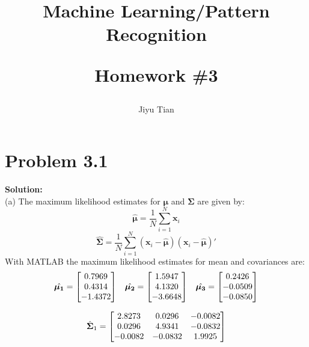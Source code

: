 \documentclass[12pt]{article}
\title{Machine Learning/Pattern Recognition\\  \begin{Large} Homework \#3 \end{Large} }
\author{Jiyu Tian}
\date{}
\begin{document}
\maketitle
\section{Problem 3.1}
\large{\textbf{Solution:}}\\
(a) The maximum likelihood estimates for $\bm{\mu}$ and $\bm{\Sigma}$ are given by:
\begin{equation*}
\hat{\bm{\mu}} = \frac{1}{N} \sum^N_{i=1} \bm{x}_i
\end{equation*}
\begin{equation*}
\hat{\bm{\Sigma}} = \frac{1}{N} \sum^N_{i=1} (\bm{x}_i - \hat{\bm{\mu}}) (\bm{x}_i - \hat{\bm{\mu}})'
\end{equation*}
With MATLAB the maximum likelihood estimates for mean and covariances are:
\begin{equation*}
\begin{aligned}
\centering {\begin{matrix}
\hat{\bm{\mu_1}} = \begin{bmatrix}
 0.7969\\
 0.4314\\ 
 -1.4372
\end{bmatrix} &  \hat{\bm{\mu_2}} = \begin{bmatrix}
 1.5947\\ 
 4.1320\\ 
 -3.6648
\end{bmatrix} & \hat{\bm{\mu_3}} = \begin{bmatrix}
 0.2426\\ 
 -0.0509\\
 -0.0850
\end{bmatrix}
\end{matrix}}
\end{aligned}
\end{equation*}

\begin{equation*}
\begin{aligned}
\centering {\begin{matrix}
\hat{\bm{\Sigma}}_1 = \begin{bmatrix}
    2.8273  &  0.0296 &  -0.0082 \\
    0.0296  &  4.9341  & -0.0832 \\
   -0.0082  & -0.0832   & 1.9925
\end{bmatrix}
\end{matrix}}
\end{aligned}
\end{equation*}
\end{document}
